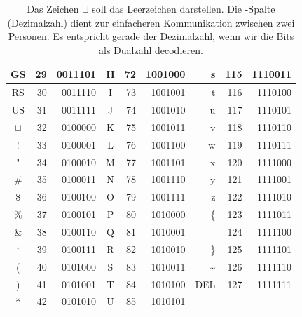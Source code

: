 \begin{table}[!htbp]
\begin{tabular}{|c|r|r||c|r|r||r|r|r|}
GS      & 29      	& 0011101          & H       & 72      	& 1001000          & s                & 115     	& 1110011         \\ \hline
RS      & 30     	& 0011110          & I       & 73      	& 1001001          & t                & 116     	& 1110100          \\ \hline
US      & 31      	& 0011111          & J       & 74      	& 1001010          & u                & 117     	& 1110101          \\ \hline
$\sqcup$ & 32 	& 0100000          & K       & 75      	& 1001011          & v                & 118     	& 1110110          \\ \hline
!       & 33      	& 0100001         & L       & 76      	& 1001100          & w                & 119     	& 1110111          \\ \hline
"       & 34      	& 0100010          & M       & 77      	& 1001101          & x                & 120     	& 1111000         \\ \hline
\#      & 35      	& 0100011          & N       & 78      	& 1001110          & y                & 121     	& 1111001          \\ \hline
\$      & 36      	& 0100100          & O       & 79      	& 1001111          & z                & 122     	& 1111010         \\ \hline
\%      & 37      	& 0100101          & P       & 80      	& 1010000          & \{               & 123     	& 1111011          \\ \hline
\&      & 38      	& 0100110          & Q       & 81      	& 1010001          & |                & 124     	& 1111100          \\ \hline
‘     & 39      	& 0100111          & R       & 82      	& 1010010          & \}               & 125     	& 1111101          \\ \hline
(       & 40      	& 0101000          & S       & 83      	& 1010011         & \textasciitilde  & 126  	& 1111110          \\ \hline
)       & 41      	& 0101001          & T       & 84      	& 1010100          & DEL                & 127     	& 1111111          \\ \hline
*       & 42      	& 0101010          & U       & 85      	& 1010101          &                  &         	&           \\ \hline
\end{tabular}
\caption{Das Zeichen $\sqcup$ soll das Leerzeichen darstellen. Die \protect{}-Spalte (Dezimalzahl) dient zur einfacheren Kommunikation zwischen zwei Personen. Es entspricht gerade der Dezimalzahl, wenn wir die Bits als Dualzahl decodieren.}
\label{table-ascii}
\end{table}

